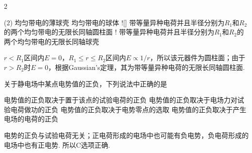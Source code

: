 \documentclass[quiet, fontset = fandol, AutoFakeSlant, 10pt]{ctexart}
\begin{document}
\begin{paracol}{2}
\begin{problem}
    \switchcolumn
    \begin{tasks}(2)
        \task 均匀带电的薄球壳
        \task 均匀带电的球体
        \task![\true] 带等量异种电荷并且半径分别为$R_1$和$R_2$的两个均匀带电的无限长同轴圆柱面
        \task! 带等量异种电荷并且半径分别为$R_1$和$R_2$的两个均匀带电的无限长同轴球壳
    \end{tasks}
    \switchcolumn\vspace*{\fill}\centering
    \vspace*{\fill}
\end{problem}
\end{paracol}
\begin{solution}
    $r<R_1$区间内$E=0$，$R_1\leq r\leq R_2$区间内$E\propto1/r$，所以该元器件为圆柱面；由于$r>R_2$时$E=0$，根据Gaussian's定理，其为带等量异种电荷的无限长同轴圆柱面.
\end{solution}

\begin{problem}
    关于静电场中某点电势值的正负，下列说法中正确的是
    \begin{tasks}
        \task 电势值的正负取决于置于该点的试验电荷的正负
        \task 电势值的正负取决于电场力对试验电荷做功的正负
        \task[\true] 电势值的正负取决于电势零点的选取
        \task 电势值的正负取决于产生电场的电荷的正负
    \end{tasks}
\end{problem}
\begin{solution}
    电势的正负与试验电荷无关；正电荷形成的电场中也可能有负电势，负电荷形成的电场中也有正电势. 所以C选项正确.
\end{solution}
\end{document}
